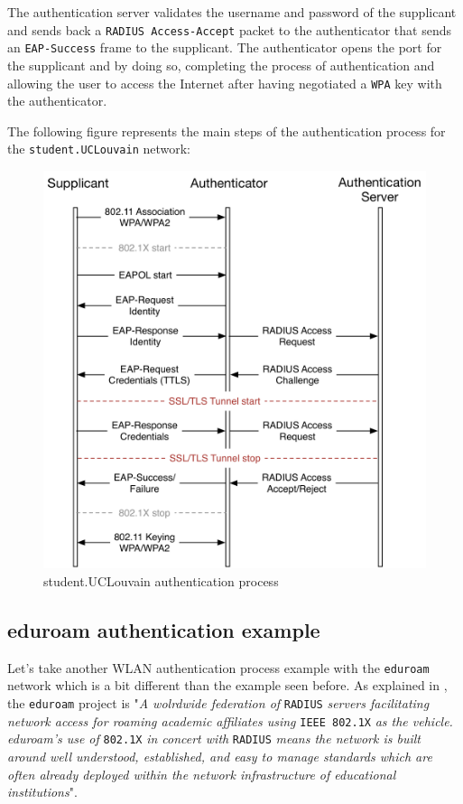The authentication server validates the username and password of the supplicant and sends back a \texttt{RADIUS Access-Accept} packet to the authenticator that sends an \texttt{EAP-Success} frame to the supplicant. The authenticator opens the port for the supplicant and by doing so, completing the process of authentication and allowing the user to access the Internet after having negotiated a \texttt{WPA} key with the authenticator.

The following figure represents the main steps of the authentication process for the \texttt{student.UCLouvain} network:

\begin{figure}[H]
	\includegraphics[width=.9\linewidth]{Pictures/Chapter2/student.png}
	\caption{student.UCLouvain authentication process}
\end{figure}


\subsection{eduroam authentication example}
Let's take another WLAN authentication process example with the \texttt{eduroam} network which is a bit different than the example seen before.
As explained in \cite{eduroamRadius}, the \texttt{eduroam} project is "\textit{A wolrdwide federation of} \texttt{RADIUS} \textit{ servers facilitating network access for roaming academic affiliates using} \texttt{IEEE 802.1X} \textit{as the vehicle. eduroam's use of} \texttt{802.1X} \textit{in concert with} \texttt{RADIUS} \textit{means the network is built around well understood, established, and easy to manage standards which are often already deployed within the network infrastructure of educational institutions}".


